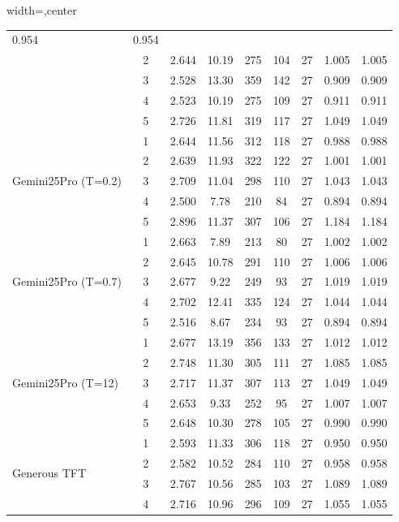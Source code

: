 \begin{table}[htbp]
\begin{adjustbox}{width=\textwidth,center}
\begin{tabular}{|l|c|c|c|c|c|c|c|c|}
0.954 & 
0.954 \\
 & 
2 & 
2.644 & 
10.19 & 
275 & 
104 & 
27 & 
1.005 & 
1.005 \\
 & 
3 & 
2.528 & 
13.30 & 
359 & 
142 & 
27 & 
0.909 & 
0.909 \\
 & 
4 & 
2.523 & 
10.19 & 
275 & 
109 & 
27 & 
0.911 & 
0.911 \\
 & 
5 & 
2.726 & 
11.81 & 
319 & 
117 & 
27 & 
1.049 & 
1.049 \\
\hline
\multirow{5}{*}{Gemini25Pro (T=0.2)} & 
1 & 
2.644 & 
11.56 & 
312 & 
118 & 
27 & 
0.988 & 
0.988 \\
 & 
2 & 
2.639 & 
11.93 & 
322 & 
122 & 
27 & 
1.001 & 
1.001 \\
 & 
3 & 
2.709 & 
11.04 & 
298 & 
110 & 
27 & 
1.043 & 
1.043 \\
 & 
4 & 
2.500 & 
7.78 & 
210 & 
84 & 
27 & 
0.894 & 
0.894 \\
 & 
5 & 
2.896 & 
11.37 & 
307 & 
106 & 
27 & 
1.184 & 
1.184 \\
\hline
\multirow{5}{*}{Gemini25Pro (T=0.7)} & 
1 & 
2.663 & 
7.89 & 
213 & 
80 & 
27 & 
1.002 & 
1.002 \\
 & 
2 & 
2.645 & 
10.78 & 
291 & 
110 & 
27 & 
1.006 & 
1.006 \\
 & 
3 & 
2.677 & 
9.22 & 
249 & 
93 & 
27 & 
1.019 & 
1.019 \\
 & 
4 & 
2.702 & 
12.41 & 
335 & 
124 & 
27 & 
1.044 & 
1.044 \\
 & 
5 & 
2.516 & 
8.67 & 
234 & 
93 & 
27 & 
0.894 & 
0.894 \\
\hline
\multirow{5}{*}{Gemini25Pro (T=12)} & 
1 & 
2.677 & 
13.19 & 
356 & 
133 & 
27 & 
1.012 & 
1.012 \\
 & 
2 & 
2.748 & 
11.30 & 
305 & 
111 & 
27 & 
1.085 & 
1.085 \\
 & 
3 & 
2.717 & 
11.37 & 
307 & 
113 & 
27 & 
1.049 & 
1.049 \\
 & 
4 & 
2.653 & 
9.33 & 
252 & 
95 & 
27 & 
1.007 & 
1.007 \\
 & 
5 & 
2.648 & 
10.30 & 
278 & 
105 & 
27 & 
0.990 & 
0.990 \\
\hline
\multirow{5}{*}{Generous TFT} & 
1 & 
2.593 & 
11.33 & 
306 & 
118 & 
27 & 
0.950 & 
0.950 \\
 & 
2 & 
2.582 & 
10.52 & 
284 & 
110 & 
27 & 
0.958 & 
0.958 \\
 & 
3 & 
2.767 & 
10.56 & 
285 & 
103 & 
27 & 
1.089 & 
1.089 \\
 & 
4 & 
2.716 & 
10.96 & 
296 & 
109 & 
27 & 
1.055 & 
1.055 \\

\end{tabular}
\end{adjustbox}
\end{table}
